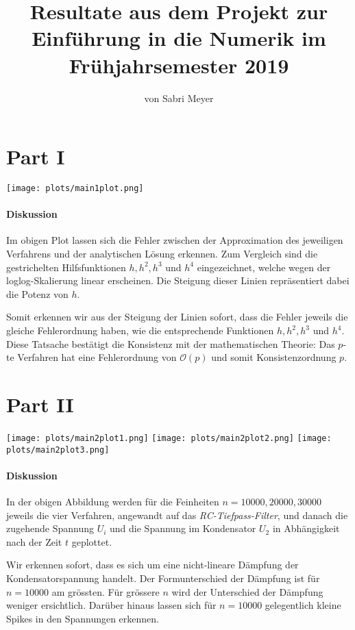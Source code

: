 \documentclass{article}
\title{Resultate aus dem Projekt zur Einf\"uhrung in die Numerik im Fr\"uhjahrsemester 2019}
\author{von Sabri Meyer}
\begin{document}
\maketitle


\section*{Part I}
%
\begin{center}
  \texttt{[image: plots/main1plot.png]}
\end{center}
\paragraph{Diskussion}
Im obigen Plot lassen sich die Fehler zwischen der Approximation des jeweiligen Verfahrens und der analytischen Lösung erkennen. Zum Vergleich sind die gestrichelten Hilfsfunktionen $h, h^2, h^3$ und  $h^4$ eingezeichnet, welche wegen der loglog-Skalierung linear erscheinen. Die Steigung dieser Linien repräsentiert dabei die Potenz von $h$.

Somit erkennen wir aus der Steigung der Linien sofort, dass die Fehler jeweils die gleiche Fehlerordnung haben, wie die entsprechende Funktionen $h, h^2, h^3$ und  $h^4$. Diese Tatsache bestätigt die Konsistenz mit der mathematischen Theorie: Das $p$-te Verfahren hat eine Fehlerordnung von $\mathcal{O}(p)$ und somit Konsistenzordnung $p$.



\section*{Part II}
%
\begin{center}
  \texttt{[image: plots/main2plot1.png]}
  \hfill{}
  \texttt{[image: plots/main2plot2.png]}
  \texttt{[image: plots/main2plot3.png]}
\end{center}
\paragraph{Diskussion}
In der obigen Abbildung werden für die Feinheiten $n=10000,20000,30000$ jeweils die vier Verfahren, angewandt auf das \emph{RC-Tiefpass-Filter}, und danach die zugehende Spannung $U_i$ und die Spannung im Kondensator $U_2$ in Abhängigkeit nach der Zeit $t$ geplottet.

Wir erkennen sofort, dass es sich um eine nicht-lineare Dämpfung der Kondensatorspannung handelt. Der Formunterschied der Dämpfung ist für $n=10000$ am grössten. Für grössere $n$ wird der Unterschied der Dämpfung weniger ersichtlich. Darüber hinaus lassen sich für $n=10000$ gelegentlich kleine Spikes in den Spannungen erkennen.
\end{document}
